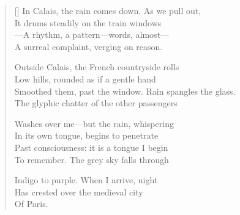 \label{ch:across_france}
\settowidth{\versewidth}{Smoothed them, past the window.   Rain spangles the glass.}
\begin{verse}[\versewidth]
In Calais, the rain comes down. As we pull out,\\
It drums steadily on the train windows\\
---A rhythm, a pattern---words, almost---\\
A surreal complaint, verging on reason.

Outside Calais, the French countryside rolls\\
Low hills, rounded as if a gentle hand\\
Smoothed them, past the window.   Rain spangles the glass.\\
The glyphic chatter of the other passengers

Washes over me---but the rain, whispering\\
In its own tongue, begins to penetrate\\
Past consciousness: it is a tongue I begin\\
To remember.  The grey sky falls through

Indigo to purple. When I arrive, night\\
Has crested over the medieval city\\
\hspace*{2\vgap} Of Paris.
\end{verse}
